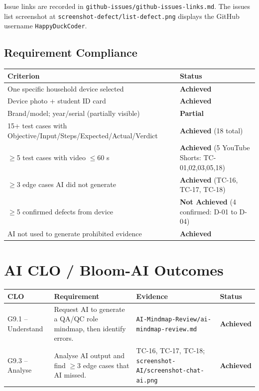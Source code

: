 \documentclass[12pt, a4paper]{article}
\newcommand{\achieved}{\textcolor{PassGreen}{\textbf{Achieved}}}
\newcommand{\partach}{\textcolor{WarnOrange}{\textbf{Partial}}}
\newcommand{\notach}{\textcolor{FailRed}{\textbf{Not Achieved}}}
\begin{document}
Issue links are recorded in \texttt{github-issues/github-issues-links.md}. The issues list screenshot at \texttt{screenshot-defect/list-defect.png} displays the GitHub username \texttt{HappyDuckCoder}.

\subsection{Requirement Compliance}

\begin{table}[h!]
\centering
\begin{tabularx}{\textwidth}{@{} X C{3cm} @{}}
\toprule
{}
\textbf{Criterion} & \textbf{Status} \\
\midrule
One specific household device selected & \achieved \\
Device photo + student ID card & \achieved \\
Brand/model; year/serial (partially visible) & \partach \\
15+ test cases with Objective/Input/Steps/Expected/Actual/Verdict & \achieved{} (18 total) \\
$\geq$5 test cases with video $\leq$60 s & \achieved{} (5 YouTube Shorts: TC-01,02,03,05,18) \\
$\geq$3 edge cases AI did not generate & \achieved{} (TC-16, TC-17, TC-18) \\
$\geq$5 confirmed defects from device & \notach{} (4 confirmed: D-01 to D-04) \\
AI not used to generate prohibited evidence & \achieved \\
\bottomrule
\end{tabularx}
\end{table}

\section{AI CLO / Bloom-AI Outcomes}

\begin{table}[h!]
\centering
\begin{tabularx}{\textwidth}{@{} L{3cm} X L{4.5cm} C{2cm} @{}}
\toprule
{}
\textbf{CLO} & \textbf{Requirement} & \textbf{Evidence} & \textbf{Status} \\
\midrule
G9.1 -- Understand & Request AI to generate a QA/QC role mindmap, then identify errors. & \texttt{AI-Mindmap-Review/\allowbreak{}ai-mindmap-review.md} & \achieved \\
G9.3 -- Analyse & Analyse AI output and find $\geq$3 edge cases that AI missed. & TC-16, TC-17, TC-18; \texttt{screenshot-AI/\allowbreak{}screenshot-chat-ai.png} & \achieved \\
\bottomrule
\end{tabularx}
\end{table}
\end{document}
